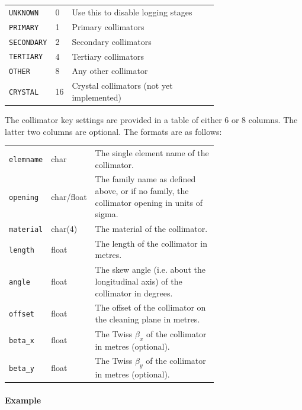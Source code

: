 \bigskip
\begin{tabular}{@{}llp{0.7\linewidth}}
    \texttt{UNKNOWN}   &  0 & Use this to disable logging stages \\
    \texttt{PRIMARY}   &  1 & Primary collimators \\
    \texttt{SECONDARY} &  2 & Secondary collimators \\
    \texttt{TERTIARY}  &  4 & Tertiary collimators \\
    \texttt{OTHER}     &  8 & Any other collimator \\
    \texttt{CRYSTAL}   & 16 & Crystal collimators (not yet implemented) \\
\end{tabular}

\bigskip
The collimator key settings are provided in a table of either 6 or 8 columns.
The latter two columns are optional.
The formats are as follows:

\bigskip
\begin{tabular}{@{}llp{0.7\linewidth}}
    \texttt{elemname} & char       & The single element name of the collimator. \\
    \texttt{opening}  & char/float & The family name as defined above, or if no family, the collimator opening in units of sigma. \\
    \texttt{material} & char(4)    & The material of the collimator. \\
    \texttt{length}   & float      & The length of the collimator in metres. \\
    \texttt{angle}    & float      & The skew angle (i.e. about the longitudinal axis) of the collimator in degrees. \\
    \texttt{offset}   & float      & The offset of the collimator on the cleaning plane in metres. \\
    \texttt{beta\_x}  & float      & The Twiss $\beta_x$ of the collimator in metres (optional). \\
    \texttt{beta\_y}  & float      & The Twiss $\beta_y$ of the collimator in metres (optional). \\
\end{tabular}

\paragraph{Example}~

